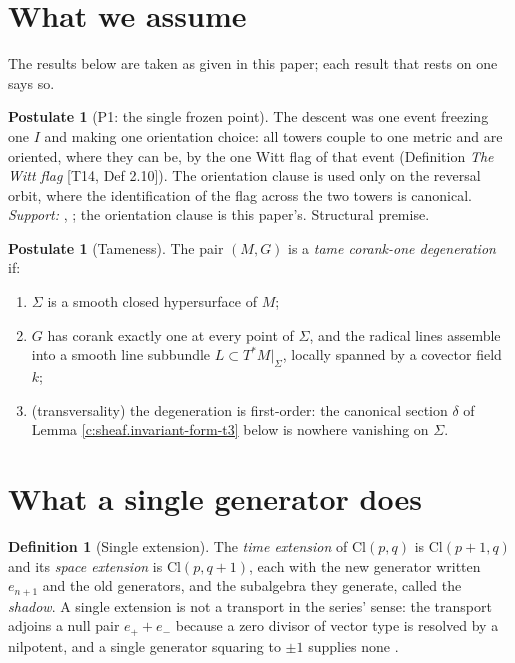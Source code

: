 \documentclass[11pt]{article}
\theoremstyle{definition}
\newtheorem{definition}[theorem]{Definition}
\newtheorem{postulate}[theorem]{Postulate}
\theoremstyle{plain}
\providecommand{\Cl}{}\renewcommand{\Cl}{\mathrm{Cl}}
\providecommand{\Sig}{}\renewcommand{\Sig}{\Sigma}
\providecommand{\shL}{}\renewcommand{\shL}{L}
\begin{document}
\section*{What we assume}
The results below are taken as given in this paper; each result that rests on one says so.
\begin{postulate}[P1: the single frozen point]\label{c:dark-matter.p1-single-frozen-point}
The descent was one event freezing one $I$ and making one orientation choice: all towers couple to one metric and are oriented, where they can be, by the one Witt flag of that event (Definition \emph{The Witt flag} [T14, Def 2.10]). The orientation clause is used only on the reversal orbit, where the identification of the flag across the two towers is canonical. \emph{Support:} \cite[Thm.~4.7]{ButlerT6}, \cite[Obs.~7.4]{ButlerT12}; the orientation clause is this paper's. Structural premise.
\end{postulate}

\begin{postulate}[Tameness]\label{c:sheaf.tameness}
The pair $(M, G)$ is a \emph{tame corank-one degeneration} if:
\begin{enumerate}
\item[(T1)] $\Sig$ is a smooth closed hypersurface of $M$;
\item[(T2)] $G$ has corank exactly one at every point of $\Sig$, and the radical lines assemble into a smooth line subbundle $\shL \subset T^*M|_\Sig$, locally spanned by a covector field $k$;
\item[(T3)] (transversality) the degeneration is first-order: the canonical section $\delta$ of Lemma \ref{c:sheaf.invariant-form-t3} below is nowhere vanishing on $\Sig$.
\end{enumerate}
\end{postulate}

\section{What a single generator does}

\begin{definition}[Single extension]\label{c:obj.odd-extensions.single-extension}
The \emph{time extension} of $\Cl(p,q)$ is $\Cl(p+1, q)$ and its \emph{space extension} is $\Cl(p, q+1)$, each with the new generator written $e_{n+1}$ and the old generators, and the subalgebra they generate, called the \emph{shadow}. A single extension is not a transport in the series' sense: the transport adjoins a null pair $e_{+} + e_{-}$ because a zero divisor of vector type is resolved by a nilpotent, and a single generator squaring to $\pm 1$ supplies none \cite[\S 8]{ButlerT1}.
\end{definition}
\end{document}
